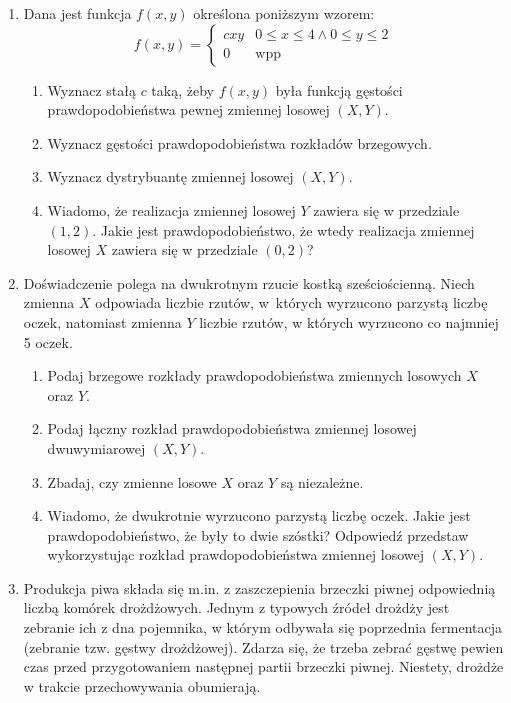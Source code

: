 \documentclass{mwart}
\newcommand{\ans}[1]{}
\begin{document}
\begin{enumerate}
\begin{enumerate}
\end{enumerate}
\item Dana jest funkcja $f(x,y)$ określona poniższym wzorem:
\[ f(x,y)=\begin{cases} cxy & 0\leq x \leq 4 \land 0\leq y\leq 2 \\ 0 & \text{wpp}\end{cases} \]
\begin{enumerate}
\item Wyznacz stałą $c$ taką, żeby $f(x,y)$ była funkcją gęstości prawdopodobieństwa pewnej zmiennej losowej $(X,Y)$. \ans{$c=\frac{1}{16}$}
\item Wyznacz gęstości prawdopodobieństwa rozkładów brzegowych. \ans{$f_X(u)=\frac{u}{8} f_Y(v)=\frac{v}{2}$}
\item Wyznacz dystrybuantę zmiennej losowej $(X,Y)$. \ans{\[F(u,v)=\begin{cases}
	0 & u\leq 0 \lor v\leq 0 \\
	\frac{u^2v^2}{64} & 0<u\leq 4 \land 0<v\leq 2 \\
	\frac{u^2}{16} & 0<u\leq 4 \land v>2 \\
	\frac{v^2}{4} & u> 4 \land 0<v\leq 2 \\
	1 & u>4\land v>2
	\end{cases}\]}
\item Wiadomo, że realizacja zmiennej losowej $Y$ zawiera się w przedziale $(1,2)$. Jakie jest prawdopodobieństwo, że wtedy realizacja zmiennej losowej $X$ zawiera się w przedziale $(0,2)$?
\ans{$P(0<X<2|1<Y<2)=\frac{P(0<X<2,1<Y<2)}{P(1<Y<2)}=\frac{F(2,2)-F(2,1)-F(0,2)+F(0,1)}{F_Y(2)-F_Y(1)}=\frac{\frac{1}{4}-\frac{1}{16}-0+0}{1-\frac{1}{4}}=\frac{3}{16}\frac{4}{3}=\frac{1}{4}$}
\end{enumerate}
\item Doświadczenie polega na dwukrotnym rzucie kostką sześciościenną. Niech zmienna $X$ odpowiada liczbie rzutów, w~których wyrzucono parzystą liczbę oczek, natomiast zmienna $Y$ liczbie rzutów, w których wyrzucono co najmniej 5 oczek.
\begin{enumerate}
\item Podaj brzegowe rozkłady prawdopodobieństwa zmiennych losowych $X$ oraz $Y$.
\item Podaj łączny rozkład prawdopodobieństwa zmiennej losowej dwuwymiarowej $(X,Y)$.
\item Zbadaj, czy zmienne losowe $X$ oraz $Y$ są niezależne.
\item Wiadomo, że dwukrotnie wyrzucono parzystą liczbę oczek. Jakie jest prawdopodobieństwo, że były to dwie szóstki? Odpowiedź przedstaw wykorzystując rozkład prawdopodobieństwa zmiennej losowej $(X,Y)$.
\end{enumerate}
\item Produkcja piwa składa się m.in. z zaszczepienia brzeczki piwnej odpowiednią liczbą komórek drożdżowych. Jednym z typowych źródeł drożdży jest zebranie ich z dna pojemnika, w którym odbywała się poprzednia fermentacja (zebranie tzw. gęstwy drożdżowej). Zdarza się, że trzeba zebrać gęstwę pewien czas przed przygotowaniem następnej partii brzeczki piwnej. Niestety, drożdże w trakcie przechowywania obumierają.


\end{enumerate}
\end{document}
